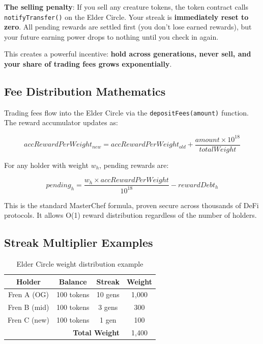 \documentclass[11pt,a4paper]{article}
\begin{document}
\textbf{The selling penalty}: If you sell any creature tokens, the token contract calls \texttt{notifyTransfer()} on the Elder Circle. Your streak is \textbf{immediately reset to zero}. All pending rewards are settled first (you don't lose earned rewards), but your future earning power drops to nothing until you check in again.

This creates a powerful incentive: \textbf{hold across generations, never sell, and your share of trading fees grows exponentially}.

\subsection{Fee Distribution Mathematics}

Trading fees flow into the Elder Circle via the \texttt{depositFees(amount)} function. The reward accumulator updates as:

\begin{equation}
accRewardPerWeight_{new} = accRewardPerWeight_{old} + \frac{amount \times 10^{18}}{totalWeight}
\end{equation}

For any holder with weight $w_h$, pending rewards are:

\begin{equation}
pending_h = \frac{w_h \times accRewardPerWeight}{10^{18}} - rewardDebt_h
\end{equation}

This is the standard MasterChef formula, proven secure across thousands of DeFi protocols. It allows O(1) reward distribution regardless of the number of holders.

\subsection{Streak Multiplier Examples}

\begin{table}[h]
\centering
\begin{tabular}{|c|c|c|c|}
\hline
\textbf{Holder} & \textbf{Balance} & \textbf{Streak} & \textbf{Weight} \\
\hline
Fren A (OG) & 100 tokens & 10 gens & 1,000 \\
Fren B (mid) & 100 tokens & 3 gens & 300 \\
Fren C (new) & 100 tokens & 1 gen & 100 \\
\hline
\multicolumn{3}{|r|}{\textbf{Total Weight}} & 1,400 \\
\hline
\end{tabular}
\caption{Elder Circle weight distribution example}
\end{table}
\end{document}
